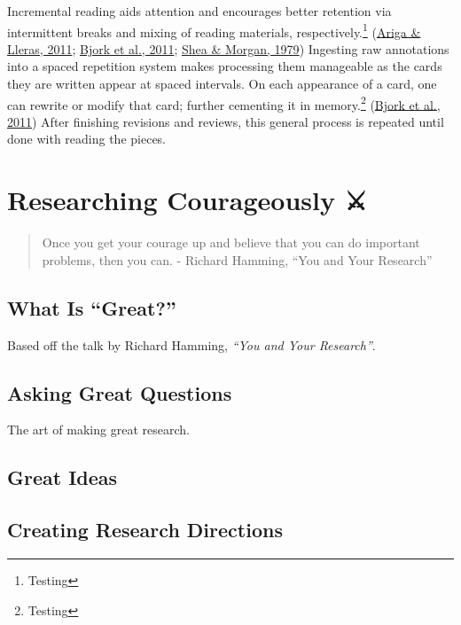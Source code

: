 \documentclass[
  notoc %
]{tufte-book}
\begin{document}
Incremental reading aids attention and encourages better retention via
intermittent breaks and mixing of reading materials,
respectively.\footnote{Testing}
(\protect\hyperlink{ref-arigaBriefRareMental2011}{Ariga \& Lleras,
2011}; \protect\hyperlink{ref-bjork2011making}{Bjork et al., 2011};
\protect\hyperlink{ref-shea1979contextual}{Shea \& Morgan, 1979})
Ingesting raw annotations into a spaced repetition system makes
processing them manageable as the cards they are written appear at
spaced intervals. On each appearance of a card, one can rewrite or
modify that card; further cementing it in memory.\footnote{Testing}
(\protect\hyperlink{ref-bjork2011making}{Bjork et al., 2011}) After
finishing revisions and reviews, this general process is repeated until
done with reading the pieces.

\hypertarget{researching-courageously}{%
\chapter{Researching Courageously ⚔️}\label{researching-courageously}}

\begin{quote}
Once you get your courage up and believe that you can do important
problems, then you can. - Richard Hamming, ``You and Your Research''
\end{quote}

\hypertarget{what-is-great}{%
\section{What Is ``Great?''}\label{what-is-great}}

Based off the talk by Richard Hamming, \emph{``You and Your Research''}.

\hypertarget{asking-great-questions}{%
\section{Asking Great Questions}\label{asking-great-questions}}

The art of making great research.

\hypertarget{great-ideas}{%
\section{Great Ideas}\label{great-ideas}}

\hypertarget{creating-research-directions}{%
\section{Creating Research
Directions}\label{creating-research-directions}}
\end{document}
